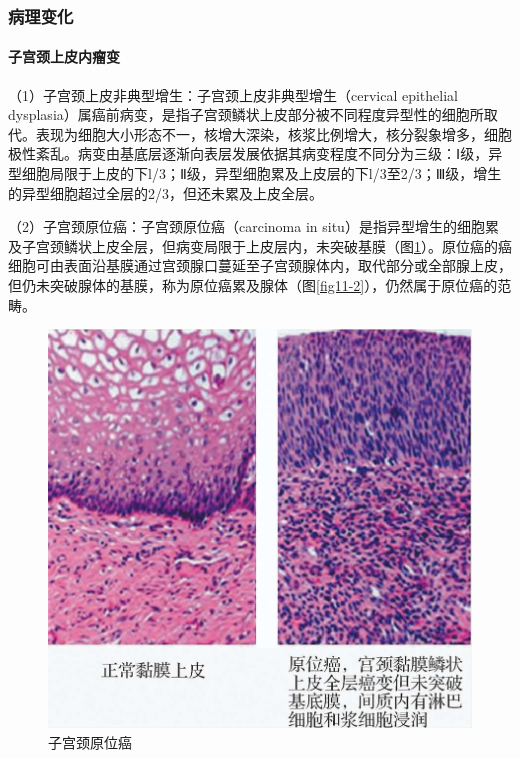 \subsubsection{病理变化}

\paragraph{子宫颈上皮内瘤变}
（1）子宫颈上皮非典型增生：子宫颈上皮非典型增生（cervical epithelial
dysplasia）属癌前病变，是指子宫颈鳞状上皮部分被不同程度异型性的细胞所取代。表现为细胞大小形态不一，核增大深染，核浆比例增大，核分裂象增多，细胞极性紊乱。病变由基底层逐渐向表层发展依据其病变程度不同分为三级：Ⅰ级，异型细胞局限于上皮的下l/3；Ⅱ级，异型细胞累及上皮层的下l/3至2/3；Ⅲ级，增生的异型细胞超过全层的2/3，但还未累及上皮全层。

（2）子宫颈原位癌：子宫颈原位癌（carcinoma in
situ）是指异型增生的细胞累及子宫颈鳞状上皮全层，但病变局限于上皮层内，未突破基膜（图\ref{fig11-1}）。原位癌的癌细胞可由表面沿基膜通过宫颈腺口蔓延至子宫颈腺体内，取代部分或全部腺上皮，但仍未突破腺体的基膜，称为原位癌累及腺体（图\ref{fig11-2}），仍然属于原位癌的范畴。

\begin{figure}[!htbp]
 \centering
 \includegraphics{./images/Image00185.jpg}
 \captionsetup{justification=centering}
 \caption{子宫颈原位癌}
 \label{fig11-1}
  \end{figure} 

